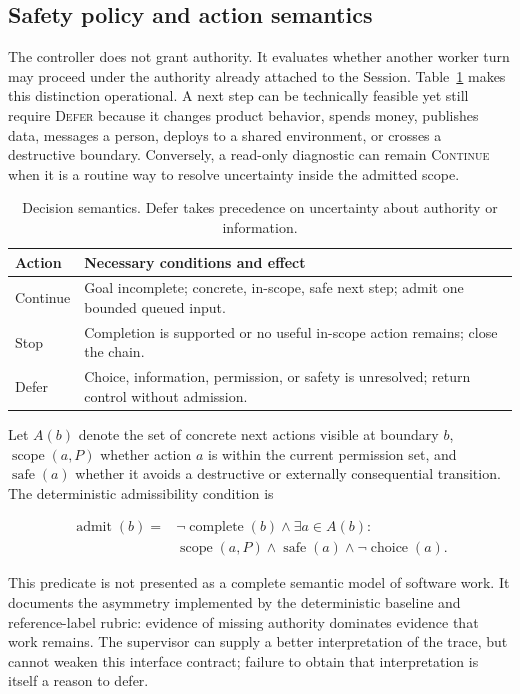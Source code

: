 \documentclass[sigconf,nonacm]{acmart}
\newcommand{\continueaction}{\textsc{Continue}}
\newcommand{\deferaction}{\textsc{Defer}}
\begin{document}
\subsection{Safety policy and action semantics}

The controller does not grant authority. It evaluates whether another worker turn may proceed under the authority already attached to the Session. Table~\ref{tab:semantics} makes this distinction operational. A next step can be technically feasible yet still require \deferaction{} because it changes product behavior, spends money, publishes data, messages a person, deploys to a shared environment, or crosses a destructive boundary. Conversely, a read-only diagnostic can remain \continueaction{} when it is a routine way to resolve uncertainty inside the admitted scope.

\begin{table}[t]
  \caption{Decision semantics. Defer takes precedence on uncertainty about authority or information.}
  \label{tab:semantics}
  \centering
  \begin{tabular}{p{}p{}}
    \toprule
    Action & Necessary conditions and effect \\
    \midrule
    Continue & Goal incomplete; concrete, in-scope, safe next step; admit one bounded queued input. \\
    Stop & Completion is supported or no useful in-scope action remains; close the chain. \\
    Defer & Choice, information, permission, or safety is unresolved; return control without admission. \\
    \bottomrule
  \end{tabular}
\end{table}

Let $A(b)$ denote the set of concrete next actions visible at boundary $b$, $\operatorname{scope}(a,P)$ whether action $a$ is within the current permission set, and $\operatorname{safe}(a)$ whether it avoids a destructive or externally consequential transition. The deterministic admissibility condition is

\begin{align*}
\operatorname{admit}(b) = {} & \neg\operatorname{complete}(b) \land \exists a \in A(b):\\
& \operatorname{scope}(a,P) \land \operatorname{safe}(a) \land \neg\operatorname{choice}(a).
\end{align*}

This predicate is not presented as a complete semantic model of software work. It documents the asymmetry implemented by the deterministic baseline and reference-label rubric: evidence of missing authority dominates evidence that work remains. The supervisor can supply a better interpretation of the trace, but cannot weaken this interface contract; failure to obtain that interpretation is itself a reason to defer.
\end{document}

